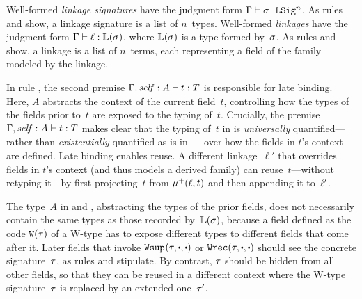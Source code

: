 Well-formed \emph{linkage signatures} have the judgment form
$ {\Gamma} \vdash {\ensuremath{\sigma}} \ \ \texttt{LSig}^{n} $.
As rules  and  show, a linkage
signature is a list of $n$~types.
%
Well-formed \emph{linkages} have the judgment form $ {\Gamma} \vdash {\ensuremath{\ell}} : {\mathbb{L}({\sigma})} $,
where $\mathbb{L}({\sigma})$ is a type formed by~$\sigma$.
As rules  and  show, a linkage is a list
of $n$~terms, each representing a field of the family modeled by the linkage.

In rule , the second premise $ {\Gamma, \mathit{self} : A} \vdash {t} : {T} $ is
responsible for late binding.
Here, $A$ abstracts the context of the current field~$t$, controlling
how the types of the fields prior to~$t$ are exposed to the typing of~$t$.
Crucially, %
the premise $ {\Gamma, \mathit{self} : A} \vdash {t} : {T} $ makes clear that
the typing of~$t$ in  is \emph{universally} quantified---%
rather than \emph{existentially} quantified as is in ---%
over how the fields in $t$'s context are defined.
Late binding enables reuse.
A different linkage~$\ell'$ that overrides fields in $t$'s context (and thus models a derived family)
can reuse~$t$---without retyping it---by first
projecting~$t$ from $\mu^+({\ell},{t})$ and then appending it to~$\ell'$.

The type~$A$ in  and ,
abstracting the types of the prior fields, does not necessarily contain the same types as those recorded by~$\mathbb{L}({\sigma})$,
because a field defined as the code $\texttt{W}({\tau})$ of a W-type has to
expose different types to different fields that come after it.
Later fields that invoke
$\Wsup{}{\wsig}{\cDot}{\cDot}$ or $\Wrec{\wsig}{\cDot}{\cDot}$
should see the concrete signature~$\tau$, as rules 
and  stipulate.
By contrast, $\tau$ should be hidden
from all other fields, so that they can be reused
in a different context where the W-type signature~$\tau$ is replaced by an extended one~$\tau'$.


